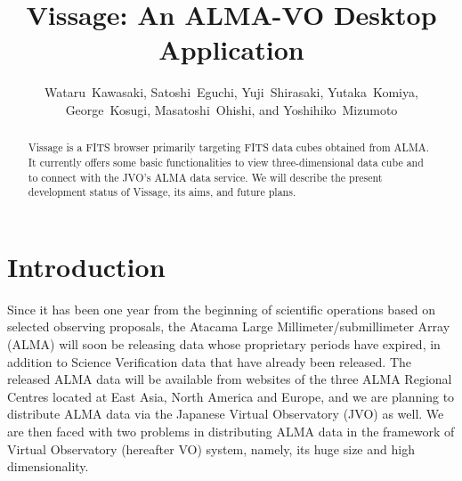 
\resetcounters




\title{Vissage: An ALMA-VO Desktop Application}
\author{Wataru~Kawasaki, Satoshi~Eguchi, Yuji~Shirasaki, Yutaka~Komiya, George~Kosugi, Masatoshi~Ohishi, 
and Yoshihiko~Mizumoto
}


\begin{abstract}
Vissage is a FITS browser primarily targeting FITS data cubes obtained from ALMA. It currently offers some basic functionalities to view three-dimensional data cube and to connect with the JVO's ALMA data service. We will describe the present development status of Vissage, its aims, and future plans.
\end{abstract}

\section{Introduction}
Since it has been one year from the beginning of scientific operations based on selected observing proposals, the Atacama Large Millimeter/submillimeter Array (ALMA) will soon be releasing data whose proprietary periods have expired, in addition to Science Verification data that have already been released. The released ALMA data will be available from websites of the three ALMA  Regional Centres located at East Asia, North America and Europe, and we are planning to distribute ALMA data via the Japanese Virtual Observatory (JVO) as well. We are then faced with two problems in distributing ALMA data in the framework of Virtual Observatory (hereafter VO) system, namely, its huge size and high dimensionality. 

